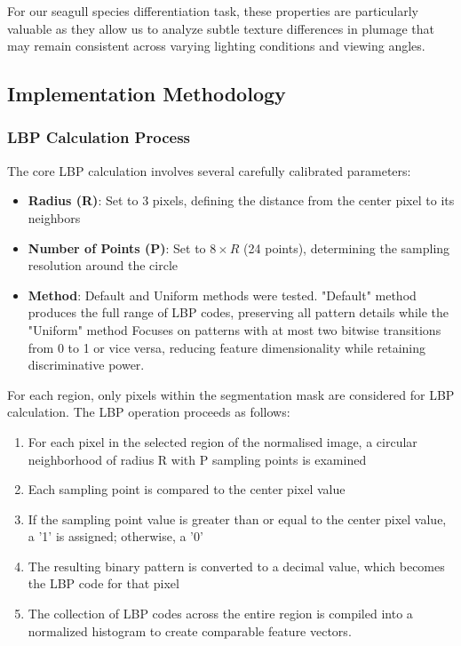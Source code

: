 \documentclass[a4paper,12pt]{report}
\begin{document}
For our seagull species differentiation task, these properties are particularly valuable as they allow us to analyze subtle texture differences in plumage that may remain consistent across varying lighting conditions and viewing angles.

\subsection{Implementation Methodology}

\subsubsection{LBP Calculation Process}

The core LBP calculation involves several carefully calibrated parameters:

\begin{itemize}
    \item \textbf{Radius (R)}: Set to 3 pixels, defining the distance from the center pixel to its neighbors
    \item \textbf{Number of Points (P)}: Set to $8 \times R$ (24 points), determining the sampling resolution around the circle
    \item \textbf{Method}: Default and Uniform methods were tested. "Default" method produces the full range of LBP codes, preserving all pattern details while the "Uniform" method Focuses on patterns with at most two bitwise transitions from 0 to 1 or vice versa, reducing feature dimensionality while retaining discriminative power.
\end{itemize}

For each region, only pixels within the segmentation mask are considered for LBP calculation. The LBP operation proceeds as follows:

\begin{enumerate}
    \item For each pixel in the selected region of the normalised image, a circular neighborhood of radius R with P sampling points is examined
    \item Each sampling point is compared to the center pixel value
    \item If the sampling point value is greater than or equal to the center pixel value, a '1' is assigned; otherwise, a '0'
    \item The resulting binary pattern is converted to a decimal value, which becomes the LBP code for that pixel
    \item The collection of LBP codes across the entire region is compiled into a normalized histogram to create comparable feature vectors.
\end{enumerate}
\end{document}
